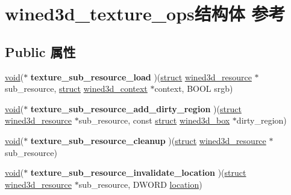 \hypertarget{structwined3d__texture__ops}{}\section{wined3d\+\_\+texture\+\_\+ops结构体 参考}
\label{structwined3d__texture__ops}
\subsection*{Public 属性}
\begin{DoxyCompactItemize}
\item 
\mbox{\label{structwined3d__texture__ops_a9ccbd8b68b2251de17b46062af4d273b}} 
\hyperlink{interfacevoid}{void}($\ast$ {\bfseries texture\+\_\+sub\+\_\+resource\+\_\+load} )(\hyperlink{interfacestruct}{struct} \hyperlink{structwined3d__resource}{wined3d\+\_\+resource} $\ast$sub\+\_\+resource, \hyperlink{interfacestruct}{struct} \hyperlink{structwined3d__context}{wined3d\+\_\+context} $\ast$context, B\+O\+OL srgb)
\item 
\mbox{\label{structwined3d__texture__ops_a73c4fccffdaf0baa1f96f46cf52b4fb7}} 
\hyperlink{interfacevoid}{void}($\ast$ {\bfseries texture\+\_\+sub\+\_\+resource\+\_\+add\+\_\+dirty\+\_\+region} )(\hyperlink{interfacestruct}{struct} \hyperlink{structwined3d__resource}{wined3d\+\_\+resource} $\ast$sub\+\_\+resource, const \hyperlink{interfacestruct}{struct} \hyperlink{structwined3d__box}{wined3d\+\_\+box} $\ast$dirty\+\_\+region)
\item 
\mbox{\label{structwined3d__texture__ops_ada716c13a97bcc62c9a315621c1d1f05}} 
\hyperlink{interfacevoid}{void}($\ast$ {\bfseries texture\+\_\+sub\+\_\+resource\+\_\+cleanup} )(\hyperlink{interfacestruct}{struct} \hyperlink{structwined3d__resource}{wined3d\+\_\+resource} $\ast$sub\+\_\+resource)
\item 
\mbox{\label{structwined3d__texture__ops_a07512a615111ed123b4dbf6e3e7891d0}} 
\hyperlink{interfacevoid}{void}($\ast$ {\bfseries texture\+\_\+sub\+\_\+resource\+\_\+invalidate\+\_\+location} )(\hyperlink{interfacestruct}{struct} \hyperlink{structwined3d__resource}{wined3d\+\_\+resource} $\ast$sub\+\_\+resource, D\+W\+O\+RD \hyperlink{structlocation}{location})

\end{DoxyCompactItemize}
